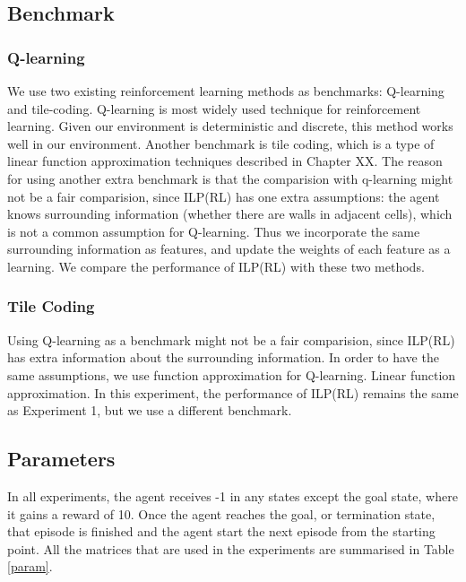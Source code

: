 \subsection{Benchmark}
\subsubsection{Q-learning}
We use two existing reinforcement learning methods as benchmarks: Q-learning and tile-coding. 
Q-learning is most widely used technique for reinforcement learning. Given our environment is deterministic and discrete, this method works well in our environment.
Another benchmark is tile coding, which is a type of linear function approximation techniques described in Chapter XX.
The reason for using another extra benchmark is that the comparision with q-learning might not be a fair comparision,
since ILP(RL) has one extra assumptions: the agent knows surrounding information (whether there are walls in adjacent cells),
which is not a common assumption for Q-learning. Thus we incorporate the same surrounding information as features, and update the weights of each feature as a learning.
We compare the performance of ILP(RL) with these two methods.

\subsubsection{Tile Coding}
Using Q-learning as a benchmark might not be a fair comparision, since ILP(RL) has extra information about the surrounding information.
In order to have the same assumptions, we use function approximation for Q-learning.
Linear function approximation.
In this experiment, the performance of ILP(RL) remains the same as Experiment 1, but we use a different benchmark. 

\subsection{Parameters}
In all experiments, the agent receives -1 in any states except the goal state, where it gains a reward of 10.
Once the agent reaches the goal, or termination state, that episode is finished and the agent start the next episode from the starting point.
All the matrices that are used in the experiments are summarised in Table \ref{param}. 

